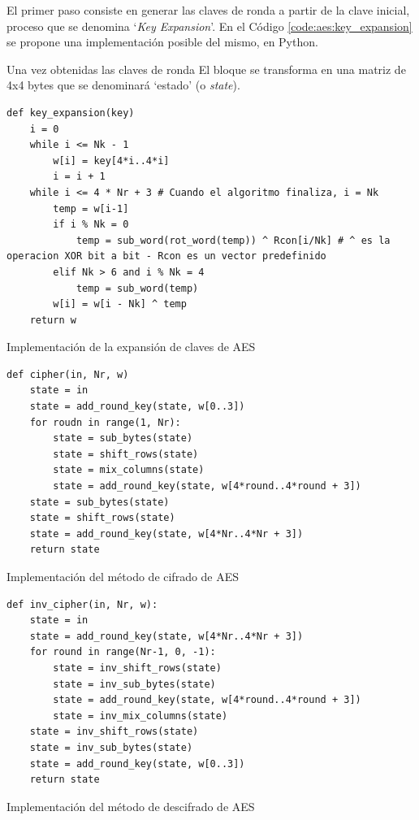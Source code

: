 \documentclass[11pt]{article}
\begin{document}
El primer paso consiste en generar las claves de ronda a partir de la clave inicial, proceso que se denomina `\textit{Key Expansion}'. En el Código \ref{code:aes:key_expansion} se propone una implementación posible del mismo, en Python.

Una vez obtenidas las claves de ronda
El bloque se transforma en una matriz de 4x4 bytes que se denominará `estado' (o \textit{state}). 

\begin{listing}[h]
\begin{verbatim}
def key_expansion(key)
    i = 0
    while i <= Nk - 1
        w[i] = key[4*i..4*i]
        i = i + 1
    while i <= 4 * Nr + 3 # Cuando el algoritmo finaliza, i = Nk
        temp = w[i-1]
        if i % Nk = 0
            temp = sub_word(rot_word(temp)) ^ Rcon[i/Nk] # ^ es la operacion XOR bit a bit - Rcon es un vector predefinido
        elif Nk > 6 and i % Nk = 4
            temp = sub_word(temp)
        w[i] = w[i - Nk] ^ temp
    return w
\end{verbatim}
\caption{Implementación de la expansión de claves de AES}
\label{code:aes:key_expansion}
\end{listing}

\begin{listing}[h]
\begin{verbatim}
def cipher(in, Nr, w)
    state = in
    state = add_round_key(state, w[0..3])
    for roudn in range(1, Nr):
        state = sub_bytes(state)
        state = shift_rows(state)
        state = mix_columns(state)
        state = add_round_key(state, w[4*round..4*round + 3])
    state = sub_bytes(state)
    state = shift_rows(state)
    state = add_round_key(state, w[4*Nr..4*Nr + 3])
    return state
\end{verbatim}
\caption{Implementación del método de cifrado de AES}
\end{listing}

\begin{listing}[h]
\begin{verbatim}
def inv_cipher(in, Nr, w):
    state = in
    state = add_round_key(state, w[4*Nr..4*Nr + 3])
    for round in range(Nr-1, 0, -1):
        state = inv_shift_rows(state)
        state = inv_sub_bytes(state)
        state = add_round_key(state, w[4*round..4*round + 3])
        state = inv_mix_columns(state)
    state = inv_shift_rows(state)
    state = inv_sub_bytes(state)
    state = add_round_key(state, w[0..3])
    return state
\end{verbatim}
\caption{Implementación del método de descifrado de AES}
\label{code:aes:inv_cipher}
\end{listing}
\end{document}
